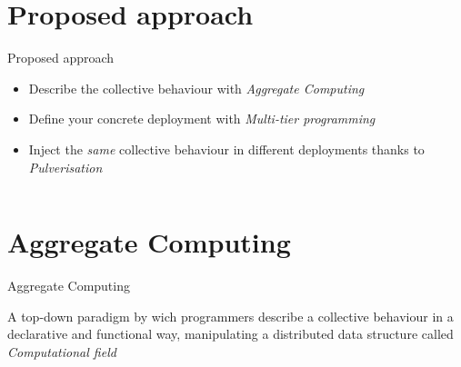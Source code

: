 \documentclass[aspectratio=169]{beamer}
\begin{document}
\section{Proposed approach}
\begin{frame}{Proposed approach}

\begin{cardTiny}
{ 
  
  \begin{itemize}
    \item<1-> Describe the collective behaviour with {\color{accent} \textit{Aggregate Computing}~\cite{DBLP:journals/jlap/ViroliBDACP19}}
    \item<2-> Define your concrete deployment with {\color{accent} \textit{Multi-tier programming}~\cite{DBLP:journals/csur/WeisenburgerWS20}}
    \item<3-> Inject the {\color{accent} \textit{same}} collective behaviour in different deployments thanks to {\color{accent} \textit{Pulverisation}~\cite{DBLP:journals/fi/CasadeiPPVW20}}
  \end{itemize}
}
\end{cardTiny}
\begin{columns}[onlytextwidth, t]
  \begin{column}{0.27\textwidth}
    \begin{adjustbox}{max width=\textwidth, valign=m, margin=0}
    \end{adjustbox}
  \end{column}
  \begin{column}{0.32\textwidth}
    \begin{adjustbox}{max width=\textwidth, valign=m}
    \end{adjustbox}
  \end{column}
  \begin{column}{0.25\textwidth}
    \begin{adjustbox}{max width=\textwidth, valign=m}
    \end{adjustbox}
  \end{column}
\end{columns}
\end{frame}

\section{Aggregate Computing}
\begin{frame}{Aggregate Computing~\cite{DBLP:journals/jlap/ViroliBDACP19}}
  \begin{cardTiny}
    {
      \color{accent} A top-down paradigm by wich programmers describe 
      a collective behaviour in a declarative and functional way,
      manipulating a distributed data structure called \textit{Computational field} 
    }
  \end{cardTiny}
  \centering
\end{frame}
\end{document}

